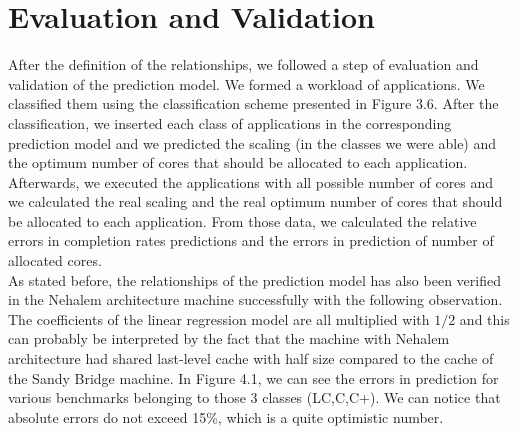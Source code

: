 \documentclass[diploma]{Styles/softlab-thesis}
\begin{document}
\section{Evaluation and Validation}

After the definition of the relationships, we followed a step of evaluation and validation of the prediction model. We formed a workload of applications. We classified them using the classification scheme presented in Figure 3.6. After the classification, we inserted each class of applications in the corresponding prediction model and we predicted the scaling (in the classes we were able) and the optimum number of cores that should be allocated to each application. Afterwards, we executed the applications with all possible number of cores and we calculated the real scaling and the real optimum number of cores that should be allocated to each application. From those data, we calculated the relative errors in completion rates predictions and the errors in prediction of number of allocated cores. \\

As stated before, the relationships of the prediction model has also been verified in the Nehalem architecture machine successfully with the following observation. The coefficients of the linear regression model are all multiplied with $1/2$ and this can probably be interpreted by the fact that the machine with Nehalem architecture had shared last-level cache with half size compared to the cache of the Sandy Bridge machine. In Figure 4.1, we can see the errors in prediction for various benchmarks belonging to those 3 classes (LC,C,C+). We can notice that absolute errors do not exceed 15\%, which is a quite optimistic number. \\
\end{document}
